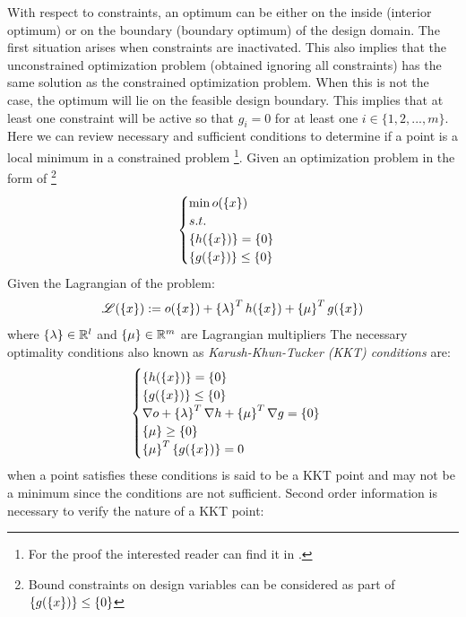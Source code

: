 With respect to constraints, an optimum can be either on the inside (interior optimum) or on the boundary (boundary optimum) of the design domain. The first situation arises when constraints are inactivated. This also implies that the unconstrained optimization problem (obtained ignoring all constraints) has the same solution as the constrained optimization problem. When this is not the case, the optimum will lie on the feasible design boundary. This implies that at least one constraint will be active so that $g_i=0$ for at least one $i\in\lbrace1,2,...,m\rbrace$. 
Here we can review necessary and sufficient conditions to determine if a point is a local minimum in a constrained problem \footnote{For the proof the interested reader can find it in \cite{papalambros2000principles}.}.
Given an optimization problem in the form of \footnote{Bound constraints on design variables can be considered as part of $\left\lbrace{g(\ensuremath\left\lbrace{x}\right \rbrace)}\right \rbrace\leq \left\lbrace{0}\right \rbrace$}
\begin{equation}
\begin{cases}
\min o(\left\lbrace{x}\right \rbrace)\\
s.t.\\
\left\lbrace{h(\ensuremath\left\lbrace{x}\right \rbrace)}\right \rbrace=\left\lbrace{0}\right \rbrace\\
\left\lbrace{g(\ensuremath\left\lbrace{x}\right \rbrace)}\right \rbrace\leq \left\lbrace{0}\right \rbrace
\end{cases}
\end{equation}
Given the Lagrangian of the problem:
\begin{equation}
\mathscr{L}(\left\lbrace{x}\right \rbrace):= o(\left\lbrace{x}\right \rbrace)+\left\lbrace{\lambda}\right \rbrace^T h(\left\lbrace{x}\right \rbrace)+\left\lbrace{\mu}\right \rbrace^T g(\left\lbrace{x}\right \rbrace) 
\end{equation}
where $\left\lbrace{\lambda}\right \rbrace\in \mathbb{R}^l$ and $\left\lbrace{\mu}\right \rbrace \in \mathbb{R}^m$ are Lagrangian multipliers
The necessary optimality conditions also known as \textit{Karush-Khun-Tucker (KKT) conditions} are:
\begin{equation}
\begin{cases}
\left\lbrace{h(\ensuremath\left\lbrace{x}\right \rbrace)}\right \rbrace=\left\lbrace{0}\right \rbrace\\
\left\lbrace{g(\ensuremath\left\lbrace{x}\right \rbrace)}\right \rbrace\leq \left\lbrace{0}\right \rbrace\\
\nabla o + \left\lbrace{\lambda}\right \rbrace^T\nabla h+\left\lbrace{\mu}\right \rbrace^T\nabla g=\left\lbrace{0}\right \rbrace\\
\left\lbrace{\mu}\right \rbrace\geq \left\lbrace{0}\right \rbrace\\
\left\lbrace{\mu}\right \rbrace^T\left\lbrace{g(\ensuremath\left\lbrace{x}\right \rbrace)}\right \rbrace=0
\end{cases}
\end{equation}
when a point satisfies these conditions is said to be a KKT point and may not be a minimum since the conditions are not sufficient. Second order information is necessary to verify the nature of a KKT point:\\
